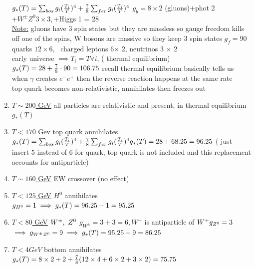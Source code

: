\documentclass[12pt]{amsart}
\begin{document}
\begin{enumerate}
$g_*(T) = \sum_{bos} g_i ( \frac{T_i}{T})^4 + \frac{7}{8} \sum_{fer} g_i ( \frac{T_i}{T})^4\\$
$g_b = 8 \times 2$ (gluons)$+$phot 2$+ W^{\pm}  Z^0 3 \times 3,+ $Higgs 1 = 28\\
\underline{Note:} gluons have 3 spin states but they are massless so gauge freedom kills off one of the spins, W bosons are massive so they keep 3 spin states
$g_f = 90$ quarks $12 \times 6,\,\,$ charged leptons 6$ \times$ 2, neutrinos 3 $\times$ 2\\
early universe $\implies T_i = T \forall i$, ( thermal equilibrium)\\
$g_*(T) = 28 + \frac{7}{8} \cdot 90 = 106.75\\$
recall thermal equilibrium basically tells us when $\gamma$ creates $e^- e^+$ then the reverse reaction happens at the same rate\\
top quark becomes non-relativistic, annihilates then freezes out
\item \underline{$T \sim 200$ GeV} all particles are relativistic and present, in thermal equilibrium $g_{*} (T)$\\
\item \underline{$T< 170$ Gev} top quark annihilates\\
$g_{*}(T) = \sum_{bos} g_i ( \frac{T_i}{T})^4 + \frac{7}{8} \sum_{fer} g_i ( \frac{T_i}{T})^4\\
g_{*}(T) = 28 + 68.25 = 96.25$ ( just insert 5 instead of 6 for quark, top quark is not included and this replacement accounts for antiparticle)\\
\item \underline{$T \sim 160$ GeV} EW crossover (no effect)\\
\item \underline{$T < 125$ GeV} $H^0$ annihilates\\
$g_{H^0} =1 \implies g_*(T) = 96.25 - 1 = 95.25\\$
\item \underline{$T< 80$ GeV} $W^{\pm},\,\,Z^0\\$
$g_{W^{\pm}} = 3+3 = 6, W^-$ is antiparticle of $W^+ g_{Z^0} = 3\\$
$\implies g_{W^{\pm} Z^0 } = 9 \implies g_*(T) = 95.25-9 = 86.25\\$
\item \underline{$T< 4 GeV$} bottom annihilates\\
$g_*(T) = 8 \times 2 + 2 + \frac{7}{8} ( 12 \times 4 + 6\times2 + 3\times2)= 75.75\\$

\end{enumerate}
\end{document}
